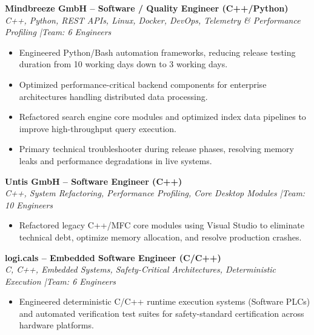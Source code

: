 \documentclass[10pt,a4paper]{article}
\begin{document}

\textbf{Mindbreeze GmbH -- Software / Quality Engineer (C++/Python)} \\
\textit{C++, Python, REST APIs, Linux, Docker, DevOps, Telemetry \& Performance Profiling \quad|\quad Team: 6 Engineers}
\begin{itemize}
    \item Engineered Python/Bash automation frameworks, reducing release testing duration from 10 working days down to 3 working days.
    \item Optimized performance-critical backend components for enterprise architectures handling distributed data processing.
    \item Refactored search engine core modules and optimized index data pipelines to improve high-throughput query execution.
    \item Primary technical troubleshooter during release phases, resolving memory leaks and performance degradations in live systems.
\end{itemize}

\vspace{0.15cm}
\textbf{Untis GmbH -- Software Engineer (C++)} \\
\textit{C++, System Refactoring, Performance Profiling, Core Desktop Modules \quad|\quad Team: 10 Engineers}
\begin{itemize}
    \item Refactored legacy C++/MFC core modules using Visual Studio to eliminate technical debt, optimize memory allocation, and resolve production crashes.
\end{itemize}

\vspace{0.15cm}
\textbf{logi.cals -- Embedded Software Engineer (C/C++)} \\
\textit{C, C++, Embedded Systems, Safety-Critical Architectures, Deterministic Execution \quad|\quad Team: 6 Engineers}
\begin{itemize}
    \item Engineered deterministic C/C++ runtime execution systems (Software PLCs) and automated verification test suites for safety-standard certification across hardware platforms.
\end{itemize}
\end{document}
